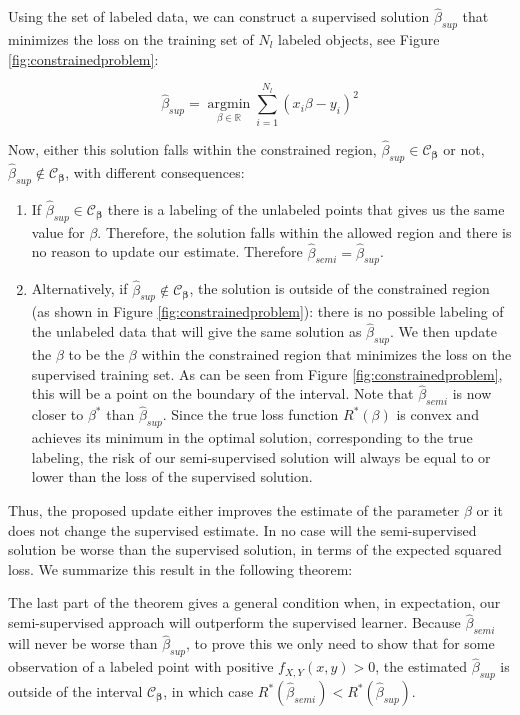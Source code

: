 \documentclass{elsarticle}
\begin{document}
\begin{pf}
Using the set of labeled data, we can construct a supervised solution $\hat{\beta}_{sup}$ that minimizes the loss on the training set of $N_l$ labeled objects, see Figure \ref{fig:constrainedproblem}:

\begin{equation} \label{supervisedsolution}
\hat{\beta}_{sup} = \operatorname*{argmin}_{\beta \in \mathbb{R}} \sum_{i=1}^{N_l} (x_i \beta - y_i)^2
\end{equation}

Now, either this solution falls within the constrained region, $\hat{\beta}_{sup} \in \mathcal{C}_{\boldsymbol{\beta}}$ or not, $\hat{\beta}_{sup} \notin \mathcal{C}_{\boldsymbol{\beta}}$, with different consequences:

\begin{enumerate}
  \item If $\hat{\beta}_{sup} \in \mathcal{C}_{\boldsymbol{\beta}}$ there is a labeling of the unlabeled points that gives us the same value for $\beta$. Therefore, the solution falls within the allowed region and there is no reason to update our estimate. Therefore $\hat{\beta}_{semi}=\hat{\beta}_{sup}$.
  \item Alternatively, if $\hat{\beta}_{sup} \notin  \mathcal{C}_{\boldsymbol{\beta}}$, the solution is outside of the constrained region (as shown in Figure \ref{fig:constrainedproblem}): there is no possible labeling of the unlabeled data that will give the same solution as $\hat{\beta}_{sup}$. We then update the $\beta$ to be the $\beta$ within the constrained region that minimizes the loss on the supervised training set. As can be seen from Figure \ref{fig:constrainedproblem}, this will be a point on the boundary of the interval. Note that $\hat{\beta}_{semi}$ is now closer to $\beta^{*}$ than $\hat{\beta}_{sup}$. Since the true loss function $R^*(\beta)$ is convex  and achieves its minimum in the optimal solution, corresponding to the true labeling, the risk of our semi-supervised solution will always be equal to or lower than the loss of the supervised solution.
\end{enumerate}

Thus, the proposed update either improves the estimate of the parameter $\beta$ or it does not change the supervised estimate. In no case will the semi-supervised solution be worse than the supervised solution, in terms of the expected squared loss. We summarize this result in the following theorem:



The last part of the theorem gives a general condition when, in expectation, our semi-supervised approach will outperform the supervised learner. Because $\hat{\beta}_{semi}$ will never be worse than $\hat{\beta}_{sup}$, to prove this we only need to show that for some observation of a labeled point with positive $f_{X,Y}(x,y)>0$, the estimated $\hat{\beta}_{sup}$ is outside of the interval $\mathcal{C}_{\boldsymbol{\beta}}$, in which case $R^*(\hat{\beta}_{semi}) < R^*(\hat{\beta}_{sup})$. 


\end{pf}
\end{document}
